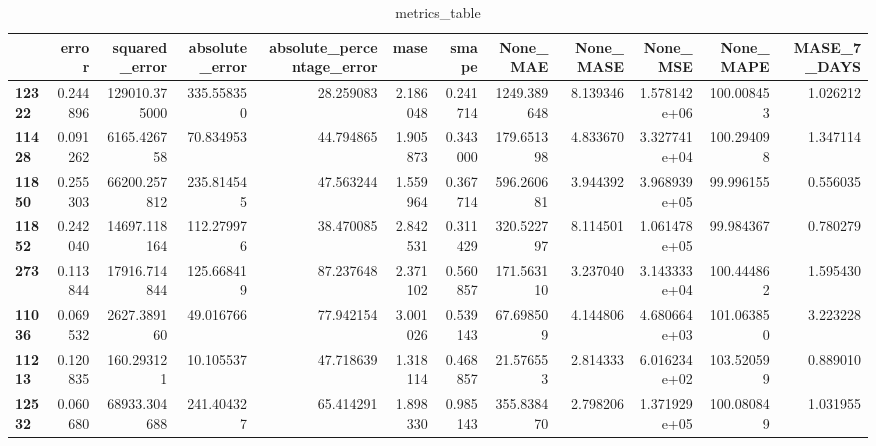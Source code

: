 \begin{table}[h]
\centering
\caption{metrics_table}
\label{table:Test wheather cnnaelstm and lstm used same parametesr for the experiment}
\begin{tabular}{lrrrrrrrrrrr}
\toprule
{} &     error &  squared\_error &  absolute\_error &  absolute\_percentage\_error &      mase &     smape &     None\_MAE &  None\_MASE &      None\_MSE &   None\_MAPE &  MASE\_7\_DAYS \\
\midrule
\textbf{12322} &  0.244896 &  129010.375000 &      335.558350 &                  28.259083 &  2.186048 &  0.241714 &  1249.389648 &   8.139346 &  1.578142e+06 &  100.008453 &     1.026212 \\
\textbf{11428} &  0.091262 &    6165.426758 &       70.834953 &                  44.794865 &  1.905873 &  0.343000 &   179.651398 &   4.833670 &  3.327741e+04 &  100.294098 &     1.347114 \\
\textbf{11850} &  0.255303 &   66200.257812 &      235.814545 &                  47.563244 &  1.559964 &  0.367714 &   596.260681 &   3.944392 &  3.968939e+05 &   99.996155 &     0.556035 \\
\textbf{11852} &  0.242040 &   14697.118164 &      112.279976 &                  38.470085 &  2.842531 &  0.311429 &   320.522797 &   8.114501 &  1.061478e+05 &   99.984367 &     0.780279 \\
\textbf{273  } &  0.113844 &   17916.714844 &      125.668419 &                  87.237648 &  2.371102 &  0.560857 &   171.563110 &   3.237040 &  3.143333e+04 &  100.444862 &     1.595430 \\
\textbf{11036} &  0.069532 &    2627.389160 &       49.016766 &                  77.942154 &  3.001026 &  0.539143 &    67.698509 &   4.144806 &  4.680664e+03 &  101.063850 &     3.223228 \\
\textbf{11213} &  0.120835 &     160.293121 &       10.105537 &                  47.718639 &  1.318114 &  0.468857 &    21.576553 &   2.814333 &  6.016234e+02 &  103.520599 &     0.889010 \\
\textbf{12532} &  0.060680 &   68933.304688 &      241.404327 &                  65.414291 &  1.898330 &  0.985143 &   355.838470 &   2.798206 &  1.371929e+05 &  100.080849 &     1.031955 \\
\bottomrule
\end{tabular}
\end{table}
